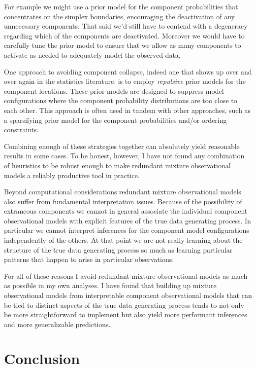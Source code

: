 \documentclass[
  letterpaper,
  DIV=11,
  numbers=noendperiod]{scrartcl}
\begin{document}
For example we might use a prior model for the component probabilities
that concentrates on the simplex boundaries, encouraging the
deactivation of any unnecessary components. That said we'd still have to
contend with a degeneracy regarding which of the components are
deactivated. Moreover we would have to carefully tune the prior model to
ensure that we allow as many components to activate as needed to
adequately model the observed data.

One approach to avoiding component collapse, indeed one that shows up
over and over again in the statistics literature, is to employ
\emph{repulsive} prior models for the component locations. These prior
models are designed to suppress model configurations where the component
probability distributions are too close to each other. This approach is
often used in tandem with other approaches, such as a sparsifying prior
model for the component probabilities and/or ordering constraints.

Combining enough of these strategies together can absolutely yield
reasonable results in some cases. To be honest, however, I have not
found any combination of heuristics to be robust enough to make
redundant mixture observational models a reliably productive tool in
practice.

Beyond computational considerations redundant mixture observational
models also suffer from fundamental interpretation issues. Because of
the possibility of extraneous components we cannot in general associate
the individual component observational models with explicit features of
the true data generating process. In particular we cannot interpret
inferences for the component model configurations independently of the
others. At that point we are not really learning about the structure of
the true data generating process so much as learning particular patterns
that happen to arise in particular observations.

For all of these reasons I avoid redundant mixture observational models
as much as possible in my own analyses. I have found that building up
mixture observational models from interpretable component observational
models that can be tied to distinct aspects of the true data generating
process tends to not only be more straightforward to implement but also
yield more performant inferences and more generalizable predictions.

\section{Conclusion}\label{conclusion}
\end{document}

